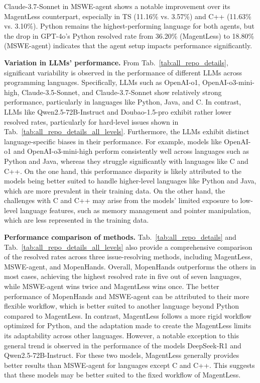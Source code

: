 \documentclass[11pt, a4paper, logo, copyright, nonumbering]{seed}
\newcommand{\magentless}{MagentLess\xspace}
\newcommand{\msweagent}{MSWE-agent\xspace}
\newcommand{\mopenhands}{MopenHands\xspace}
\begin{document}
Claude-3.7-Sonnet in \msweagent shows a notable improvement over its \magentless counterpart, especially in TS (11.16\% vs. 3.57\%) and C++ (11.63\% vs. 3.10\%).
Python remains the highest-performing language for both agents, but the drop in GPT-4o's Python resolved rate from 36.20\% (\magentless) to 18.80\% (\msweagent) indicates that the agent setup impacts performance significantly.
\fi

\textbf{Variation in LLMs' performance.}
From Tab.~\ref{tab:all_repo_details}, significant variability is observed in the performance of different LLMs across programming languages.
Specifically, LLMs such as OpenAI-o1, OpenAI-o3-mini-high, Claude-3.5-Sonnet, and Claude-3.7-Sonnet show relatively strong performance, particularly in languages like Python, Java, and C. 
In contrast, LLMs like Qwen2.5-72B-Instruct and Doubao-1.5-pro exhibit rather lower resolved rates, particularly for hard-level issues shown in Tab.~\ref{tab:all_repo_details_all_levels}.
Furthermore, the LLMs exhibit distinct language-specific biases in their performance. 
For example, models like OpenAI-o1 and OpenAI-o3-mini-high perform consistently well across languages such as Python and Java, whereas they struggle significantly with languages like C and C++. 
On the one hand, this performance disparity is likely attributed to the models being better suited to handle higher-level languages like Python and Java, which are more prevalent in their training data. 
On the other hand, the challenges with C and C++ may arise from the models' limited exposure to low-level language features, such as memory management and pointer manipulation, which are less represented in the training data.

\textbf{Performance comparison of methods.}
Tab.~\ref{tab:all_repo_details} and Tab.~\ref{tab:all_repo_details_all_levels} also provide a comprehensive comparison of the resolved rates across three issue-resolving methods, including \magentless, \msweagent, and \mopenhands. 
Overall, \mopenhands outperforms the others in most cases, achieving the highest resolved rate in five out of seven languages, while \msweagent wins twice and \magentless wins once.
The better performance of \mopenhands and \msweagent can be attributed to their more flexible workflow, which is better suited to another language beyond Python compared to \magentless.
In contrast, \magentless follows a more rigid workflow optimized for Python, and the adaptation made to create the \magentless limits its adaptability across other languages.
However, a notable exception to this general trend is observed in the performance of the models DeepSeek-R1 and Qwen2.5-72B-Instruct. 
For these two models, \magentless generally provides better results than \msweagent for languages except C and C++. This suggests that these models may be better suited to the fixed workflow of \magentless.
\end{document}
